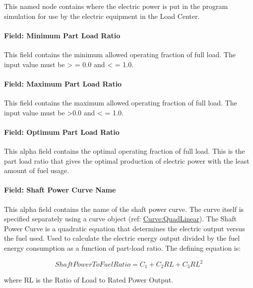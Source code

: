 This named node contains where the electric power is put in the program simulation for use by the electric equipment in the Load Center.

\paragraph{Field: Minimum Part Load Ratio}\label{field-minimum-part-load-ratio}

This field contains the minimum allowed operating fraction of full load. The input value must be \textgreater{} = 0.0 and \textless{} = 1.0.

\paragraph{Field: Maximum Part Load Ratio}\label{field-maximum-part-load-ratio}

This field contains the maximum allowed operating fraction of full load. The input value must be \textgreater{}0.0 and \textless{} = 1.0.

\paragraph{Field: Optimum Part Load Ratio}\label{field-optimum-part-load-ratio}

This alpha field contains the optimal operating fraction of full load. This is the part load ratio that gives the optimal production of electric power with the least amount of fuel usage.

\paragraph{Field: Shaft Power Curve Name}\label{field-shaft-power-curve-name}

This alpha field contains the name of the shaft power curve. The curve itself is specified separately using a curve object (ref: \hyperref[curvequadlinear]{Curve:QuadLinear}). The Shaft Power Curve is a quadratic equation that determines the electric output versus the fuel used. Used to calculate the electric energy output divided by the fuel energy consumption as a function of part-load ratio. The defining equation is:

\begin{equation}
ShaftPowerToFuelRatio = {C_1} + {C_2}RL + {C_3}R{L^2}
\end{equation}

where RL is the Ratio of Load to Rated Power Output.

